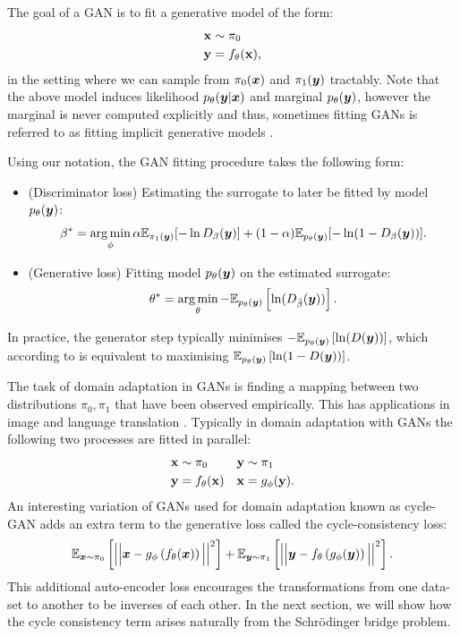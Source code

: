 \documentclass[a4paper,12pt,twoside,openright]{report}
\theoremstyle{definition}
\begin{document}
The goal of a GAN \citep{goodfellow2014generative} is to fit a generative model of the form:
\begin{align*}
    {\mathbf{x}} &\sim \pi_0 \\
    {\mathbf{y}} &= f_{\theta}({\mathbf{x}}),
\end{align*}
in the setting where we can sample from $\pi_0({\bm{x}})$ and $\pi_1({\bm{y}})$ tractably. Note that the above model induces likelihood $p_{\theta}({\bm{y}} | {\bm{x}})$ and marginal $p_{\theta}({\bm{y}})$, however the marginal is never computed explicitly and thus, sometimes fitting GANs is referred to as fitting implicit generative models \citep{mohamed2016learning}.

Using our notation, the GAN fitting procedure \citep{goodfellow2014generative} takes the following form:

\begin{itemize}
    \item (Discriminator loss) Estimating the surrogate to later be fitted by model $p_{\theta}({\bm{y}})$:
 $$ {\beta}^{*} = \operatorname*{arg\,min}_{\phi} \alpha \mathbb{E}_{\pi_1({\bm{y}})}[-\operatorname{ln} D_{\beta}({\bm{y}})] + (1-\alpha)\mathbb{E}_{p_{\theta}({\bm{y}})}[-\operatorname{ln} (1-D_{\beta}({\bm{y}}))].$$ 
 \item (Generative loss) Fitting model $p_{\theta}({\bm{y}})$ on the estimated surrogate:
 $$\theta^{*} = \operatorname*{arg\,min}_{\theta}-\mathbb{E}_{p_{\theta}({\bm{y}})}\left[\operatorname{ln}(D_{\hat{\beta}}({\bm{y}}))\right].$$ 
\end{itemize}

In practice, the generator step \citep{goodfellow2014generative} typically minimises $-\mathbb{E}_{p_{\theta}({\bm{y}})}\left[\operatorname{ln}(D({\bm{y}}))\right]$, which according to \cite{goodfellow2014generative} is equivalent to maximising  $\mathbb{E}_{p_{\theta}({\bm{y}})}\left[\operatorname{ln}(1-D({\bm{y}}))\right]$.

The task of domain adaptation in GANs is finding a mapping between two distributions $\pi_0, \pi_1$ that have been observed empirically. This has applications in image and language translation \citep{zhu2017unpaired,lample2017unsupervised}. Typically in domain adaptation with GANs the following two processes are fitted in parallel:
\begin{align*}
    {\mathbf{x}} &\sim \pi_0    &{\mathbf{y}} &\sim \pi_1\\
    {\mathbf{y}} &= f_{\theta}({\mathbf{x}})   &{\mathbf{x}} &= g_{\phi}({\mathbf{y}}).
\end{align*}
An interesting variation of GANs used for domain adaptation known as cycle-GAN adds an extra term to the generative loss called the cycle-consistency loss:
\begin{align*}
   \mathbb{E}_{{\bm{x}} \sim \pi_0}\left[ \Big|\Big|{\bm{x}}- g_\phi\left(f_\theta({\bm{x}}) \right) \Big|\Big|^2\right] +  \mathbb{E}_{{\bm{y}} \sim \pi_1}\left[ \Big|\Big|{\bm{y}}- f_\theta\left(g_\phi({\bm{y}}) \right) \Big|\Big|^2\right].
\end{align*}
This additional auto-encoder loss encourages the transformations from one data-set to another to be inverses of each other. In the next section, we will show how the cycle consistency term arises naturally from the Schrödinger bridge problem.
\end{document}
